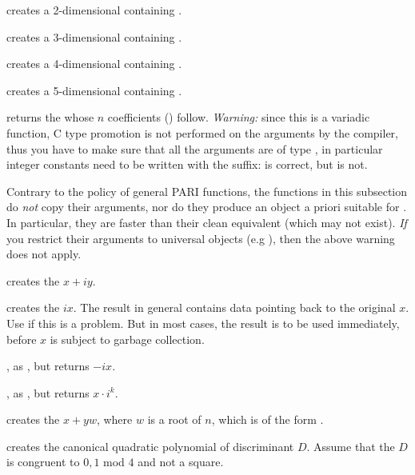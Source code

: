  creates a 2-dimensional 
containing \kbd{[x, y]}.

 creates a 3-dimensional
 containing \kbd{[x, y, z]}.

 creates a 4-dimensional
 containing \kbd{[x, y, z, t]}.

 creates a
5-dimensional  containing \kbd{[x, y, z, t, u]}.

 returns the  whose $n$
coefficients () follow.
\emph{Warning:} since this is a variadic function, C type promotion is not
performed on the arguments by the compiler, thus you have to make sure that all
the arguments are of type , in particular integer constants need to
be written with the  suffix:  is correct,
but  is not.

\label{se:unclean}

Contrary to the policy of general PARI functions, the functions in this
subsection do \emph{not} copy their arguments, nor do they produce an object
a priori suitable for . In particular, they are
faster than their clean equivalent (which may not exist). \emph{If} you
restrict their arguments to universal objects (e.g ),
then the above warning does not apply.

 creates the  $x + iy$.

 creates the  $ix$. The result in
general contains data pointing back to the original $x$. Use  if
this is a problem. But in most cases, the result is to be used immediately,
before $x$ is subject to garbage collection.

, as , but returns $-ix$.

, as , but returns
$x \cdot i^k$.

 creates the  $x + yw$,
where $w$ is a root of $n$, which is of the form .

 creates the canonical quadratic polynomial of
discriminant $D$. Assume that the  $D$ is congruent to $0,1$ mod $4$
and not a square.

